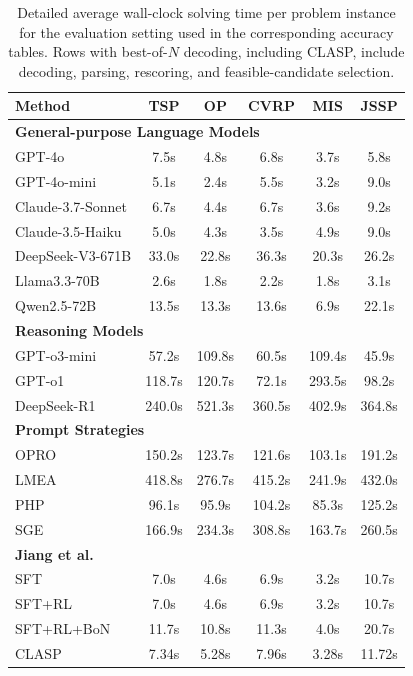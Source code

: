 \documentclass{article}
\theoremstyle{remark}
\begin{document}
\begin{table}[!t]
\centering
\caption{Detailed average wall-clock solving time per problem instance for the evaluation setting used in the corresponding accuracy tables. Rows with best-of-\(N\) decoding, including CLASP, include decoding, parsing, rescoring, and feasible-candidate selection.}
\label{tab:solving_time}
\begin{tabular}{lccccc}
\toprule
Method & TSP & OP & CVRP & MIS & JSSP \\
\midrule
\multicolumn{6}{l}{\textbf{General-purpose Language Models}} \\
GPT-4o             & 7.5s  & 4.8s   & 6.8s   & 3.7s   & 5.8s \\
GPT-4o-mini        & 5.1s  & 2.4s   & 5.5s   & 3.2s   & 9.0s \\
Claude-3.7-Sonnet  & 6.7s  & 4.4s   & 6.7s   & 3.6s   & 9.2s \\
Claude-3.5-Haiku   & 5.0s  & 4.3s   & 3.5s   & 4.9s   & 9.0s \\
DeepSeek-V3-671B   & 33.0s & 22.8s  & 36.3s  & 20.3s  & 26.2s \\
Llama3.3-70B       & 2.6s  & 1.8s   & 2.2s   & 1.8s   & 3.1s \\
Qwen2.5-72B        & 13.5s & 13.3s  & 13.6s  & 6.9s   & 22.1s \\
\midrule
\multicolumn{6}{l}{\textbf{Reasoning Models}} \\
GPT-o3-mini        & 57.2s  & 109.8s & 60.5s  & 109.4s & 45.9s \\
GPT-o1             & 118.7s & 120.7s & 72.1s  & 293.5s & 98.2s \\
DeepSeek-R1        & 240.0s & 521.3s & 360.5s & 402.9s & 364.8s \\
\midrule
\multicolumn{6}{l}{\textbf{Prompt Strategies}} \\
OPRO               & 150.2s & 123.7s & 121.6s & 103.1s & 191.2s \\
LMEA               & 418.8s & 276.7s & 415.2s & 241.9s & 432.0s \\
PHP                & 96.1s  & 95.9s  & 104.2s & 85.3s  & 125.2s \\
SGE                & 166.9s & 234.3s & 308.8s & 163.7s & 260.5s \\
\midrule
\multicolumn{6}{l}{\textbf{Jiang et al.}} \\
SFT                & 7.0s  & 4.6s  & 6.9s  & 3.2s & 10.7s \\
SFT+RL             & 7.0s  & 4.6s  & 6.9s  & 3.2s & 10.7s \\
SFT+RL+BoN         & 11.7s & 10.8s & 11.3s & 4.0s & 20.7s \\
\midrule
CLASP              & 7.34s & 5.28s & 7.96s & 3.28s & 11.72s \\
\bottomrule
\end{tabular}
\end{table}


\FloatBarrier
\clearpage

\end{document}
